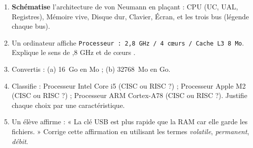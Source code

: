 \documentclass[11pt]{article}
\begin{document}
\begin{exercice}
\begin{enumerate}
\item \textbf{Schématise} l'architecture de von Neumann en plaçant : CPU (UC, UAL, Registres), Mémoire vive, Disque dur, Clavier, Écran, et les trois bus (légende chaque bus).
\item Un ordinateur affiche \texttt{Processeur : 2,8 GHz / 4 cœurs / Cache L3 8 Mo}. Explique le sens de ,8 GHz \fg{} et de  cœurs \fg{}.
\item Convertis : (a) \SI{16}{Go} en Mo ; (b) \SI{32768}{Mo} en Go.
\item Classifie : Processeur Intel Core i5 (CISC ou RISC ?) ; Processeur Apple M2 (CISC ou RISC ?) ; Processeur ARM Cortex-A78 (CISC ou RISC ?). Justifie chaque choix par une caractéristique.
\item Un élève affirme : « La clé USB est plus rapide que la RAM car elle garde les fichiers. » Corrige cette affirmation en utilisant les termes \emph{volatile}, \emph{permanent}, \emph{débit}.
\end{enumerate}
\end{exercice}
\end{document}
